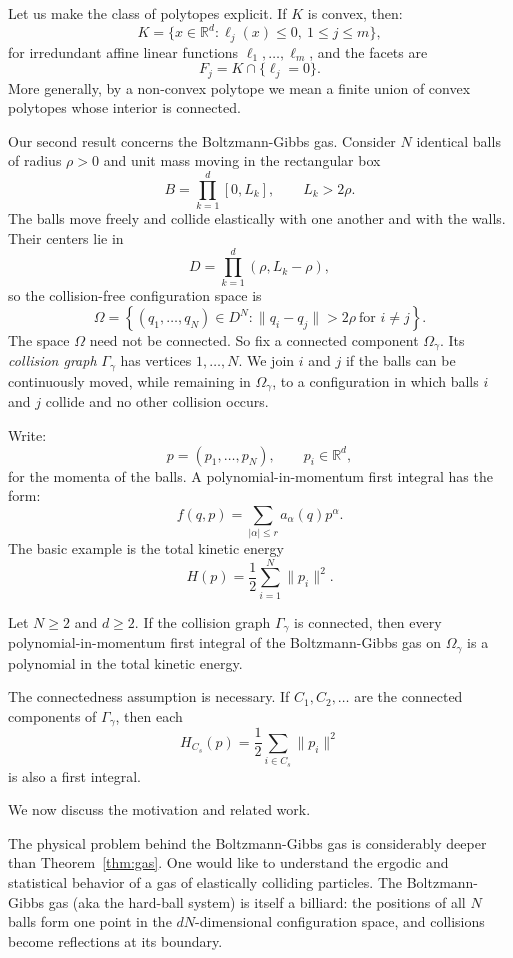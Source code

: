 \documentclass[12pt,reqno]{amsart}
\numberwithin{equation}{section}
\def \R {\mathbb{R}}
\begin{document}
Let us make the class of 
polytopes explicit. If \(K\) is convex, 
then:
\[
K=\{x\in\R^d:\ell_j(x)\le0,\ 1\le j\le m\},
\]
for irredundant affine linear functions \(\ell_1,\ldots,\ell_m\), and the
facets are
\[
F_j=K\cap\{\ell_j=0\}.
\]
More generally, by a non-convex polytope we mean a finite union of convex polytopes whose interior is connected.
\smallskip%

Our second result concerns the 
Boltzmann-Gibbs gas. Consider \(N\) identical
balls of radius \(\rho>0\) and unit mass moving in the rectangular box
\[
B=\prod_{k=1}^d[0,L_k],\qquad L_k>2\rho.
\]
The balls move freely and collide elastically with one another and with the
walls. Their centers lie in
\[
D=\prod_{k=1}^d(\rho,L_k-\rho),
\]
so the collision-free configuration space is
\[
\Omega=
\left\{
(q_1,\ldots,q_N)\in D^N:
\|q_i-q_j\|>2\rho\ \text{for }i\ne j
\right\}.
\]
The space \(\Omega\) need not 
be connected. So fix a connected component
\(\Omega_\gamma\). Its \emph{collision graph} \(\Gamma_\gamma\) has vertices
\(1,\ldots,N\). We join \(i\) and \(j\) if the balls can be continuously moved, while remaining in \(\Omega_\gamma\), to a configuration in which balls \(i\) and \(j\)
collide and no other collision occurs.
\smallskip%

Write:
\[
p=(p_1,\ldots,p_N),\qquad p_i\in\R^d,
\]
for the momenta of the balls. A polynomial-in-momentum first integral has the form:
\[
f(q,p)=\sum_{|\alpha|\le r}a_\alpha(q)p^\alpha.
\]
The basic example is the total
kinetic energy
\[
H(p)=\frac12\sum_{i=1}^N\|p_i\|^2.
\]
\begin{theorem}\label{thm:gas}
Let \(N\ge2\) and \(d\ge2\). If the collision graph
\(\Gamma_\gamma\) is connected, then every polynomial-in-momentum first
integral of the Boltzmann-Gibbs gas on \(\Omega_\gamma\) is a polynomial
in the total kinetic energy.
\end{theorem}

The connectedness assumption is 
necessary. If \(C_1,C_2,\ldots\) are the connected components of
\(\Gamma_\gamma\), then each
\[
H_{C_s}(p)
=
\frac12\sum_{i\in C_s}\|p_i\|^2
\]
is also a first integral.
\smallskip%

We now discuss the motivation and related work.
\smallskip%

The physical problem behind the 
Boltzmann-Gibbs gas is considerably deeper
than Theorem~\ref{thm:gas}. One would like to understand the ergodic and
statistical behavior of a gas of elastically colliding particles. The
Boltzmann-Gibbs gas (aka the hard-ball system) is itself a billiard:
the positions of all \(N\) balls form one point in the \(dN\)-dimensional
configuration space, and collisions become reflections at its boundary.
\smallskip%
\end{document}
